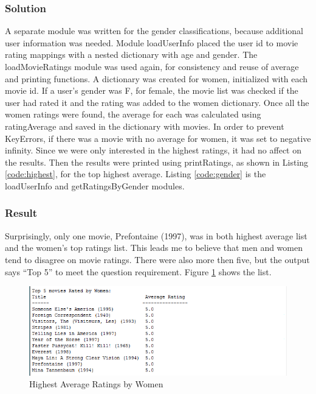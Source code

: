 \documentclass[paper=a4, fontsize=11pt]{scrartcl} %
\numberwithin{equation}{section} %
\numberwithin{figure}{section} %
\numberwithin{table}{section} %
\begin{document}
\subsubsection{Solution}
A separate module was written for the gender classifications, because additional user information was needed.
Module loadUserInfo placed the user id to movie rating mappings with a nested dictionary with age and gender.\cite{bib:nested}
The loadMovieRatings module was used again, for consistency and reuse of average and printing functions.
A dictionary was created for women, initialized with each movie id.  
If a user's gender was F, for female, the movie list was checked if the user had rated it and the rating was added to the women dictionary.
Once all the women ratings were found, the average for each was calculated using ratingAverage and saved in the dictionary with movies.
In order to prevent KeyErrors, if there was a movie with no average for women, it was set to negative infinity.\cite{bib:pycookbook}
Since we were only interested in the highest ratings, it had no affect on the results.
Then the results were printed using printRatings, as shown in Listing \ref{code:highest}, for the top highest average.
Listing \ref{code:gender} is the loadUserInfo and getRatingsByGender modules.\\



\subsubsection{Result}
Surprisingly, only one movie, Prefontaine (1997), was in both highest average list and the women's top ratings list.
This leads me to believe that men and women tend to disagree on movie ratings.
There were also more then five, but the output says ``Top 5'' to meet the question requirement.
Figure \ref{fig:women} shows the list.

\begin{figure}[H]
\includegraphics[width=1\textwidth]{pics/topWomen}
\caption{Highest Average Ratings by Women}
\label{fig:women}
\end{figure}
\end{document}
